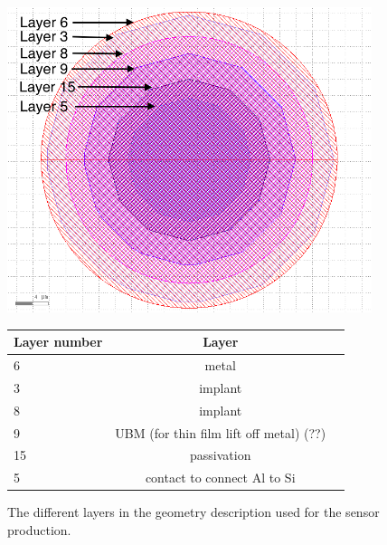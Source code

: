 \begin{figure}[htbp]
  \centering
  \begin{minipage}[t]{.4\textwidth}
    \centering
    \vspace{0pt}
    \includegraphics[width=0.95\textwidth]{figures/ActiveEdge/pixelLayout_withLayers.png}
    \caption{The different layers in the geometry description used for
      the sensor production.}
    \label{fig:PixelLayout}
  \end{minipage}
  \hfill
  \begin{minipage}[t]{.56\textwidth}
    \centering
    \vspace{0pt}
    \label{tab:PixelStackDimensions}
    \begin{tabular}{l c c}
      \toprule
      Layer number & Layer \\
      \midrule
      6 & metal\\
      3 & implant \\
      8 & implant \\
      9 & UBM (for thin film lift off metal) (??) \\
      15 & passivation \\
      5 & contact to connect Al to Si \\
      \bottomrule
    \end{tabular}
  \end{minipage}
\end{figure}


